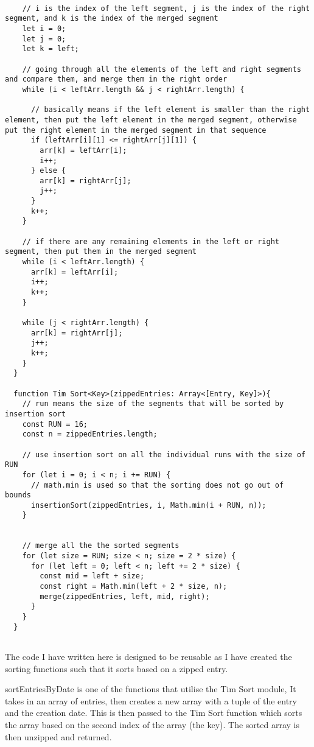 \begin{verbatim}
  
    // i is the index of the left segment, j is the index of the right segment, and k is the index of the merged segment
    let i = 0;
    let j = 0;
    let k = left;
    
    // going through all the elements of the left and right segments and compare them, and merge them in the right order
    while (i < leftArr.length && j < rightArr.length) {
      
      // basically means if the left element is smaller than the right element, then put the left element in the merged segment, otherwise put the right element in the merged segment in that sequence
      if (leftArr[i][1] <= rightArr[j][1]) {
        arr[k] = leftArr[i];
        i++;
      } else {
        arr[k] = rightArr[j];
        j++;
      }
      k++;
    }
  
    // if there are any remaining elements in the left or right segment, then put them in the merged segment
    while (i < leftArr.length) {
      arr[k] = leftArr[i];
      i++;
      k++;
    }
  
    while (j < rightArr.length) {
      arr[k] = rightArr[j];
      j++;
      k++;
    }
  }
  
  function Tim Sort<Key>(zippedEntries: Array<[Entry, Key]>){
    // run means the size of the segments that will be sorted by insertion sort
    const RUN = 16;
    const n = zippedEntries.length;
  
    // use insertion sort on all the individual runs with the size of RUN
    for (let i = 0; i < n; i += RUN) {
      // math.min is used so that the sorting does not go out of bounds
      insertionSort(zippedEntries, i, Math.min(i + RUN, n));
    }
  
  
    // merge all the the sorted segments
    for (let size = RUN; size < n; size = 2 * size) {
      for (let left = 0; left < n; left += 2 * size) {
        const mid = left + size;
        const right = Math.min(left + 2 * size, n);
        merge(zippedEntries, left, mid, right);
      }
    }
  }
  
\end{verbatim}

The code I have written here is designed to be reusable as I have created the sorting functions such that it sorts based on a zipped entry.

sortEntriesByDate is one of the functions that utilise the Tim Sort module, It takes in an array of entries, then creates a new array with a tuple of the entry and the creation date. This is then passed to the Tim Sort function which sorts the array based on the second index of the array (the key). The sorted array is then unzipped and returned. 

